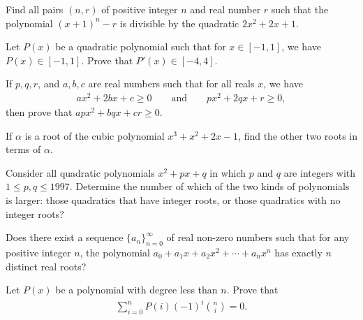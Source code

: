 \begin{question}[name={1996 Poland}]
    Find all pairs $(n,r)$ of positive integer $n$ and real number $r$ such that the polynomial $(x+1)^n-r$ is divisible by the quadratic $2x^2+2x+1$.
\end{question}


\begin{question}[name={1914 Hungary}]
    Let $P(x)$ be a quadratic polynomial such that for $x\in [-1,1]$, we have $P(x)\in [-1,1]$. Prove that $P'(x) \in [-4,4]$.
\end{question}




\begin{question}[name={1918 Hungary}]
    If $p,q,r$, and $a,b,c$ are real numbers such that for all reals $x$, we have
    \begin{align*}
        ax^2+2bx+c \geq 0 \qquad \text{and} \qquad px^2+2qx+r \geq 0,
    \end{align*}
    then prove that $apx^2+bqx+cr \geq 0$. 
\end{question}



\begin{question}[name={1988 Iran}]
    If $\alpha$ is a root of the cubic polynomial $x^3+x^2+2x-1$, find the other two roots in terms of $\alpha$.
\end{question}


\begin{question}[name={1997 Iran}]
    Consider all quadratic polynomials $x^2+px+q$ in which $p$ and $q$ are integers with $1 \leq p,q \leq 1997$. Determine the number of which of the two kinds of polynomials is larger: those quadratics that have integer roots, or those quadratics with no integer roots?
\end{question}




\begin{question}
    Does there exist a sequence $\{a_n\}_{n=0}^\infty$ of real non-zero numbers such that for any positive integer $n$, the polynomial $a_0+a_1x+a_2x^2+\cdots+a_nx^n$ has exactly $n$ distinct real roots?
\end{question}


\begin{question}[name={1999 Iran}]
    Let $P(x)$ be a polynomial with degree less than $n$. Prove that
    \begin{align*}
        \sum_{i=0}^n P(i)(-1)^i\binom{n}{i}=0.
    \end{align*}
\end{question}


